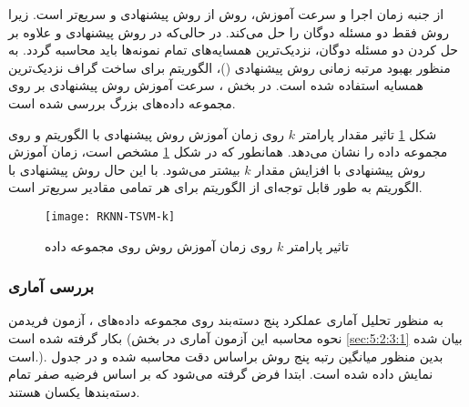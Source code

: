 از جنبه زمان اجرا و سرعت آموزش، روش  از روش پیشنهادی و  سریع‌تر است. زیرا روش فقط دو مسئله دوگان را حل می‌کند. در حالی‌که در روش پیشنهادی و  علاوه بر حل کردن دو مسئله دوگان، نزدیک‌ترین همسایه‌های تمام نمونه‌ها باید محاسبه گردد. به منظور بهبود مرتبه زمانی روش پیشنهادی ()، الگوریتم  برای ساخت گراف نزدیک‌ترین همسایه استفاده شده است. در بخش ، سرعت آموزش روش پیشنهادی بر روی مجموعه داده‌های بزرگ بررسی شده است.

شکل \ref{fig:RKNN-TSVM-k} تاثیر مقدار پارامتر $k$ روی زمان آموزش روش پیشنهادی با الگوریتم  و  روی مجموعه داده  را نشان می‌دهد. همانطور که در شکل \ref{fig:RKNN-TSVM-k} مشخص است، زمان آموزش روش پیشنهادی با افزایش مقدار $k$ بیشتر می‌شود. با این حال روش پیشنهادی با الگوریتم  به طور قابل توجه‌ای از الگوریتم  برای هر تمامی مقادیر سریع‌تر است.

\begin{figure}[!t]
	\centering
	\texttt{[image: RKNN-TSVM-k]}
	\caption{تاثیر پارامتر $k$ روی زمان آموزش روش  روی مجموعه داده  }
	\label{fig:RKNN-TSVM-k}
\end{figure}

\subsubsection{بررسی آماری}\label{sec:5:3:3:3}
به منظور تحلیل آماری عملکرد پنج دسته‌بند روی مجموعه داده‌های ، آزمون فریدمن بکار گرفته شده است (نحوه محاسبه این آزمون آماری در بخش \ref{sec:5:2:3:1} بیان شده است.). بدین منظور میانگین رتبه پنج روش براساس دقت محاسبه شده و در جدول نمایش داده شده است. ابتدا فرض گرفته می‌شود که بر اساس فرضیه صفر تمام دسته‌بندها یکسان هستند.

